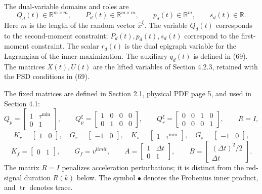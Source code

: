 \documentclass[10pt]{article}
\begin{document}
The dual-variable domains and roles are
\[
Q_d(t)\in\mathbb R^{m\times m},\qquad
P_d(t)\in\mathbb R^{m\times m},\qquad
p_d(t)\in\mathbb R^m,\qquad s_d(t)\in\mathbb R.
\]
Here \(m\) is the length of the random vector \(\hat x^\xi\). The variable \(Q_d(t)\) corresponds to the second-moment constraint; \(P_d(t),p_d(t),s_d(t)\) correspond to the first-moment constraint. The scalar \(r_d(t)\) is the dual epigraph variable for the Lagrangian of the inner maximization. The auxiliary \(q_d(t)\) is defined in (69). The matrices \(X(t),U(t)\) are the lifted variables of Section 4.2.3, retained with the PSD conditions in (69).

The fixed matrices are defined in Section 2.1, physical PDF page 5, and used in Section 4.1:
\[
Q_p=\begin{bmatrix}1&\tau^{\min}\\0&1\end{bmatrix},\qquad
Q_p^\xi=\begin{bmatrix}1&0&0&0\\0&1&0&0\end{bmatrix},\qquad
Q_r^\xi=\begin{bmatrix}0&0&1&0\\0&0&0&1\end{bmatrix},\qquad R=I,
\]
\[
K_r=\begin{bmatrix}1&0\end{bmatrix},\quad
G_r=\begin{bmatrix}-1&0\end{bmatrix},\quad
K_s=\begin{bmatrix}1&\tau^{\min}\end{bmatrix},\quad
G_s=\begin{bmatrix}-1&0\end{bmatrix},
\]
\[
K_f=\begin{bmatrix}0&1\end{bmatrix},\qquad G_f=v^{limit},\qquad
A=\begin{bmatrix}1&\Delta t\\0&1\end{bmatrix},\qquad
B=\begin{bmatrix}(\Delta t)^2/2\\\Delta t\end{bmatrix}.
\]
The matrix \(R=I\) penalizes acceleration perturbations; it is distinct from the red-signal duration \(R(k)\) below. The symbol \(\bullet\) denotes the Frobenius inner product, and \(\operatorname{tr}\) denotes trace.
\end{document}

